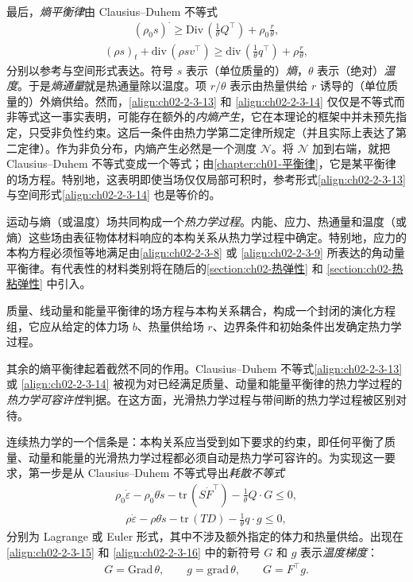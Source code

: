 ﻿\documentclass[../../main.tex]{subfiles}
\begin{document}
最后，\emph{熵平衡律}由 Clausius--Duhem 不等式
\begin{align}
(\rho_{0}s)^{\cdot}\geqslant\mathrm{Div}\,\left(\frac{1}{\theta}Q^{\top}\right)+\rho_{0}\frac{r}{\theta},
\label{align:ch02-2-3-13}
\end{align}
\begin{align}
(\rho s)_{t}+\mathrm{div}\,(\rho sv^{\top})\geqslant\mathrm{div}\,\left(\frac{1}{\theta}q^{\top}\right)+\rho\frac{r}{\theta},
\label{align:ch02-2-3-14}
\end{align}
分别以参考与空间形式表达。符号 $s$ 表示（单位质量的）\emph{熵}，$\theta$ 表示（绝对）\emph{温度}。于是\emph{熵通量}就是热通量除以温度。项 $r/\theta$ 表示由热量供给 $r$ 诱导的（单位质量的）外熵供给。然而，\eqref{align:ch02-2-3-13} 和 \eqref{align:ch02-2-3-14} 仅仅是不等式而非等式这一事实表明，可能存在额外的\emph{内熵产生}，它在本理论的框架中并未预先指定，只受非负性约束。这后一条件由热力学第二定律所规定（并且实际上表达了第二定律）。作为非负分布，内熵产生必然是一个测度 $\mathscr{N}$。将 $\mathscr{N}$ 加到右端，就把 Clausius--Duhem 不等式变成一个等式；由\cref{chapter:ch01-平衡律}，它是某平衡律的场方程。特别地，这表明即使当场仅仅局部可积时，参考形式\eqref{align:ch02-2-3-13} 与空间形式\eqref{align:ch02-2-3-14} 也是等价的。


运动与熵（或温度）场共同构成一个\emph{热力学过程}。内能、应力、热通量和温度（或熵）这些场由表征物体材料响应的本构关系从热力学过程中确定。特别地，应力的本构方程必须恒等地满足由\eqref{align:ch02-2-3-8} 或 \eqref{align:ch02-2-3-9} 所表达的角动量平衡律。有代表性的材料类别将在随后的\cref{section:ch02-热弹性} 和 \cref{section:ch02-热粘弹性} 中引入。

质量、线动量和能量平衡律的场方程与本构关系耦合，构成一个封闭的演化方程组，它应从给定的体力场 $b$、热量供给场 $r$、边界条件和初始条件出发确定热力学过程。

其余的熵平衡律起着截然不同的作用。Clausius--Duhem 不等式\eqref{align:ch02-2-3-13} 或 \eqref{align:ch02-2-3-14} 被视为对已经满足质量、动量和能量平衡律的热力学过程的\emph{热力学可容许性}判据。在这方面，光滑热力学过程与带间断的热力学过程被区别对待。

连续热力学的一个信条是：本构关系应当受到如下要求的约束，即任何平衡了质量、动量和能量的光滑热力学过程都必须自动是热力学可容许的。为实现这一要求，第一步是从 Clausius--Duhem 不等式导出\emph{耗散不等式}
\begin{align}
\rho_{0}\dot{\varepsilon}-\rho_{0}\theta\dot{s}-\mathrm{tr}\,(S\dot{F}^{\top})-\frac{1}{\theta}Q\cdot G\leqslant 0,
\label{align:ch02-2-3-15}
\end{align}
\begin{align}
\rho\dot{\varepsilon}-\rho\theta\dot{s}-\mathrm{tr}\,(TD)-\frac{1}{\theta}q\cdot g\leqslant 0,
\label{align:ch02-2-3-16}
\end{align}
分别为 Lagrange 或 Euler 形式，其中不涉及额外指定的体力和热量供给。出现在\eqref{align:ch02-2-3-15} 和 \eqref{align:ch02-2-3-16} 中的新符号 $G$ 和 $g$ 表示\emph{温度梯度}：
\begin{align}
G=\mathrm{Grad}\,\theta,\qquad g=\mathrm{grad}\,\theta,\qquad G=F^{\top}g.
\label{align:ch02-2-3-17}
\end{align}
\end{document}
